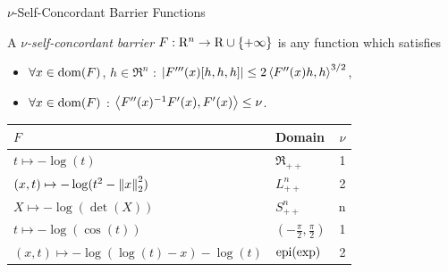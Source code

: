 \documentclass[9pt]{beamer}
\begin{document}
\begin{frame}{$\nu$-Self-Concordant Barrier Functions}

  A \emph{$\nu$-self-concordant barrier} $F:\mathrm{R}^n\to\mathrm{R}\cup\{+\infty\}$ is any function which satisfies
  \begin{itemize}
  \item $\forall x\in\operatorname{dom}(F)$, $h\in\Re^n$ : $\left|F'''(x)[h, h, h]\right|\leq 2 \left<F''(x) h, h\right>^{3/2}$,
  \item $\forall x\in \operatorname{dom}(F)$ : $\left<F''(x)^{-1} F'(x), F'(x)\right> \leq \nu$.
  \end{itemize}

  \vfill

  \begin{center}
    \begin{tabular}{llr}
      \hline
      $F$ & Domain & $\nu$\\
      \hline
      $t\mapsto-\log(t)$ & $\Re_{++}$ & 1\\
      $(x, t)\mapsto-\log(t^2-\left\|x\right\|_2^2)$ & $L^n_{++}$ & 2\\
      $X\mapsto -\log(\det(X))$ & $S_{++}^n$ & n \\
      $t\mapsto-\log(\cos(t))$ & $(-\frac{\pi}{2},\frac{\pi}{2})$ & 1\\
      $(x, t)\mapsto-\log(\log(t)-x)-\log(t)$ & $\operatorname{epi}(\exp)$ & 2\\
      \hline
    \end{tabular}
  \end{center}

\end{frame}


\end{document}
